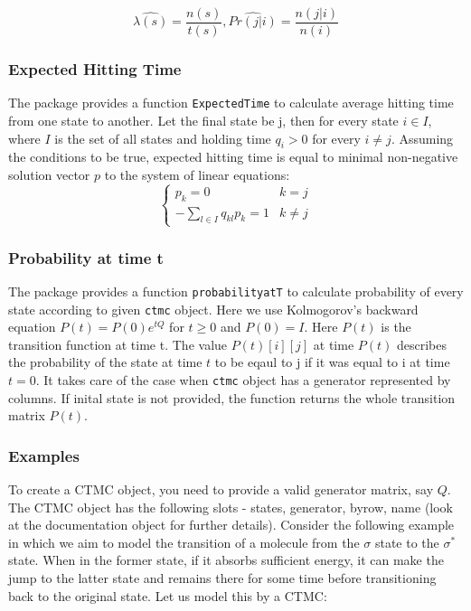 \documentclass[article,nojss]{jss}
\begin{document}
\[
\hat{\lambda(s)} = \frac{n(s)}{t(s)},\hat{Pr(j|i)}=\frac{n(j|i)}{n(i)}
\]

\hypertarget{expected-hitting-time}{%
\subsubsection{Expected Hitting Time}\label{expected-hitting-time}}

The package provides a function \texttt{ExpectedTime} to calculate average hitting time from one state to another. Let the final state be j, then for every state \(i \in I\), where \(I\) is the set of all states and holding time \(q_{i} > 0\) for every \(i \neq j\). Assuming the conditions to be true, expected hitting time is equal to minimal non-negative solution vector \(p\) to the system of linear equations:
\begin{equation}
\begin{cases}
      p_{k} = 0 & k = j \\
      -\sum_{l \in I} q_{kl}p_{k} = 1 & k \neq j
\end{cases}
\label{eq:EHT}
\end{equation}

\hypertarget{probability-at-time-t}{%
\subsubsection{Probability at time t}\label{probability-at-time-t}}

The package provides a function \texttt{probabilityatT} to calculate probability of every state according to given \texttt{ctmc} object. Here we use Kolmogorov's backward equation \(P(t) = P(0)e^{tQ}\) for \(t \geq 0\) and \(P(0) = I\). Here \(P(t)\) is the transition function at time t. The value \(P(t)[i][j]\) at time \(P(t)\) describes the probability of the state at time \(t\) to be eqaul to j if it was equal to i at time \(t=0\).
It takes care of the case when \texttt{ctmc} object has a generator represented by columns.
If inital state is not provided, the function returns the whole transition matrix \(P(t)\).

\hypertarget{examples}{%
\subsubsection{Examples}\label{examples}}

To create a CTMC object, you need to provide a valid generator matrix, say \(Q\). The CTMC object has the following slots - states, generator, byrow, name (look at the documentation object for further details). Consider the following example in which we aim to model the transition of a molecule from the \(\sigma\) state to the \(\sigma^*\) state. When in the former state, if it absorbs sufficient energy, it can make the jump to the latter state and remains there for some time before transitioning back to the original state. Let us model this by a CTMC:
\end{document}

